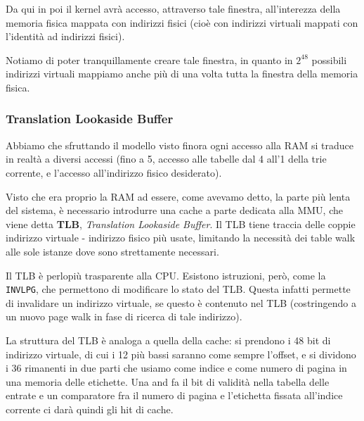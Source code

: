 \documentclass[a4paper,11pt]{article}
\begin{document}
Da qui in poi il kernel avrà accesso, attraverso tale finestra, all'interezza della memoria fisica mappata con indirizzi fisici (cioè con indirizzi virtuali mappati con l'identità ad indirizzi fisici).

Notiamo di poter tranquillamente creare tale finestra, in quanto in $2^{48}$ possibili indirizzi virtuali mappiamo anche più di una volta tutta la finestra della memoria fisica.

\subsubsection{Translation Lookaside Buffer}
Abbiamo che sfruttando il modello visto finora ogni accesso alla RAM si traduce in realtà a diversi accessi (fino a 5, accesso alle tabelle dal 4 all'1 della trie corrente, e l'accesso all'indirizzo fisico desiderato).

Visto che era proprio la RAM ad essere, come avevamo detto, la parte più lenta del sistema, è necessario introdurre una cache a parte dedicata alla MMU, che viene detta \textbf{TLB}, \textit{Translation Lookaside Buffer}.
Il TLB tiene traccia delle coppie indirizzo virtuale - indirizzo fisico più usate, limitando la necessità dei table walk alle sole istanze dove sono strettamente necessari.

Il TLB è perlopiù trasparente alla CPU.
Esistono istruzioni, però, come la \lstinline|INVLPG|, che permettono di modificare lo stato del TLB.
Questa infatti permette di invalidare un indirizzo virtuale, se questo è contenuto nel TLB (costringendo a un nuovo page walk in fase di ricerca di tale indirizzo).

La struttura del TLB è analoga a quella della cache: si prendono i 48 bit di indirizzo virtuale, di cui i 12 più bassi saranno come sempre l'offset, e si dividono i 36 rimanenti in due parti che usiamo come indice e come numero di pagina in una memoria delle etichette.
Una and fa il bit di validità nella tabella delle entrate e un comparatore fra il numero di pagina e l'etichetta fissata all'indice corrente ci darà quindi gli hit di cache.
\end{document}
